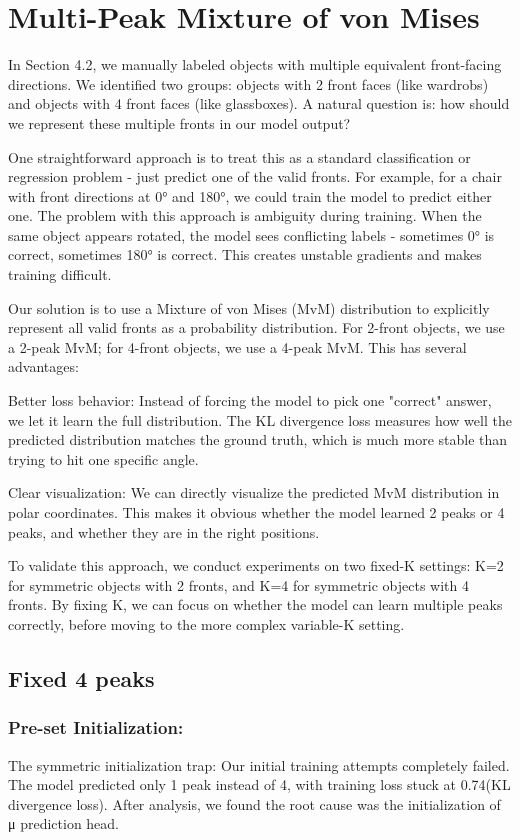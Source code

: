 \section{Multi-Peak Mixture of von Mises}
In Section 4.2, we manually labeled objects with multiple equivalent front-facing directions. We identified two groups: objects with 2 front faces (like wardrobs) and objects with 4 front faces (like glassboxes). A natural question is: how should we represent these multiple fronts in our model output?

One straightforward approach is to treat this as a standard classification or regression problem - just predict one of the valid fronts. For example, for a chair with front directions at 0° and 180°, we could train the model to predict either one. The problem with this approach is ambiguity during training. When the same object appears rotated, the model sees conflicting labels - sometimes 0° is correct, sometimes 180° is correct. This creates unstable gradients and makes training difficult.

Our solution is to use a Mixture of von Mises (MvM) distribution to explicitly represent all valid fronts as a probability distribution. For 2-front objects, we use a 2-peak MvM; for 4-front objects, we use a 4-peak MvM. This has several advantages:

Better loss behavior: Instead of forcing the model to pick one "correct" answer, we let it learn the full distribution. The KL divergence loss measures how well the predicted distribution matches the ground truth, which is much more stable than trying to hit one specific angle.

Clear visualization: We can directly visualize the predicted MvM distribution in polar coordinates. This makes it obvious whether the model learned 2 peaks or 4 peaks, and whether they are in the right positions.

To validate this approach, we conduct experiments on two fixed-K settings: K=2 for symmetric objects with 2 fronts, and K=4 for symmetric objects with 4 fronts. By fixing K, we can focus on whether the model can learn multiple peaks correctly, before moving to the more complex variable-K setting.

\subsection{Fixed 4 peaks}
\subsubsection{Pre-set Initialization:}
The symmetric initialization trap: Our initial training attempts completely failed. The model predicted only 1 peak instead of 4, with training loss stuck at 0.74(KL divergence loss). After analysis, we found the root cause was the initialization of μ prediction head.

